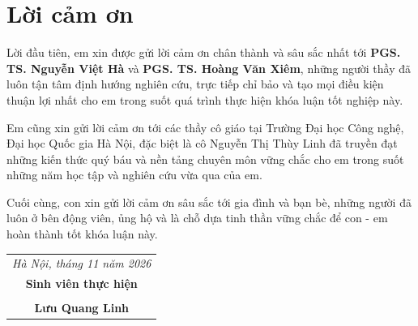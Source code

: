 \chapter*{Lời cảm ơn}
\thispagestyle{empty}

Lời đầu tiên, em xin được gửi lời cảm ơn chân thành và sâu sắc nhất tới \textbf{PGS. TS. Nguyễn Việt Hà} và \textbf{PGS. TS. Hoàng Văn Xiêm}, những người thầy đã luôn tận tâm định hướng nghiên cứu, trực tiếp chỉ bảo và tạo mọi điều kiện thuận lợi nhất cho em trong suốt quá trình thực hiện khóa luận tốt nghiệp này.

Em cũng xin gửi lời cảm ơn tới các thầy cô giáo tại Trường Đại học Công nghệ, Đại học Quốc gia Hà Nội, đặc biệt là cô Nguyễn Thị Thùy Linh đã truyền đạt những kiến thức quý báu và nền tảng chuyên môn vững chắc cho em trong suốt những năm học tập và nghiên cứu vừa qua của em.

Cuối cùng, con xin gửi lời cảm ơn sâu sắc tới gia đình và bạn bè, những người đã luôn ở bên động viên, ủng hộ và là chỗ dựa tinh thần vững chắc để con - em hoàn thành tốt khóa luận này.

\vspace{1.5cm}
\begin{flushright}
\begin{tabular}{c}
\textit{Hà Nội, tháng 11 năm 2026} \\
\textbf{Sinh viên thực hiện} \\
\vspace{2cm} \\
\textbf{Lưu Quang Linh}
\end{tabular}
\end{flushright}

